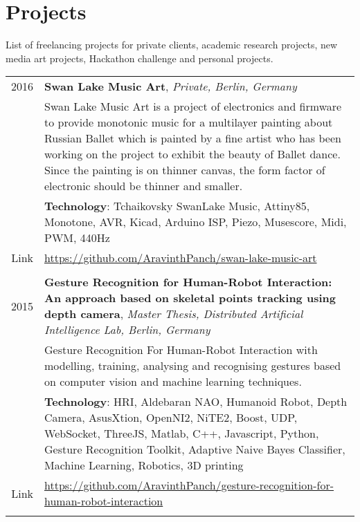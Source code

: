 \section{Projects} 
List of freelancing projects for private clients, academic research projects, new media art projects, Hackathon challenge and personal projects.

\begin{longtable}
	{r|p{13cm}} 

	\textsc{2016} & \textbf{Swan Lake Music Art}, \emph{Private, Berlin, Germany}\\
	&\footnotesize{Swan Lake Music Art is a project of electronics and firmware to provide monotonic music for a multilayer painting about Russian Ballet which is painted by a fine artist who has been working on the project to exhibit the beauty of Ballet dance. Since the painting is on thinner canvas, the form factor of electronic should be thinner and smaller.}\\
	&\footnotesize{\textbf{Technology}: Tchaikovsky SwanLake Music, Attiny85, Monotone, AVR, Kicad, Arduino ISP, Piezo, Musescore, Midi, PWM, 440Hz}\\
	\footnotesize{Link}&\footnotesize{\url{https://github.com/AravinthPanch/swan-lake-music-art}}\\
	
	\multicolumn{2}{c}{} \\
	
	\textsc{2015} & \textbf{Gesture Recognition for Human-Robot Interaction: An approach based on skeletal points tracking using depth camera}, \emph{Master Thesis, Distributed Artificial Intelligence Lab, Berlin, Germany}\\
	&\footnotesize{Gesture Recognition For Human-Robot Interaction with modelling, training, analysing and recognising gestures based on computer vision and machine learning techniques.}\\
	&\footnotesize{\textbf{Technology}: HRI, Aldebaran NAO, Humanoid Robot, Depth Camera, AsusXtion, OpenNI2, NiTE2, Boost, UDP, WebSocket, ThreeJS, Matlab, C++, Javascript, Python, Gesture Recognition Toolkit, Adaptive Naive Bayes Classifier, Machine Learning, Robotics, 3D printing}\\
	\footnotesize{Link}&\footnotesize{\url{https://github.com/AravinthPanch/gesture-recognition-for-human-robot-interaction}}\\
	
	\multicolumn{2}{c}{} \\
	

\end{longtable}
